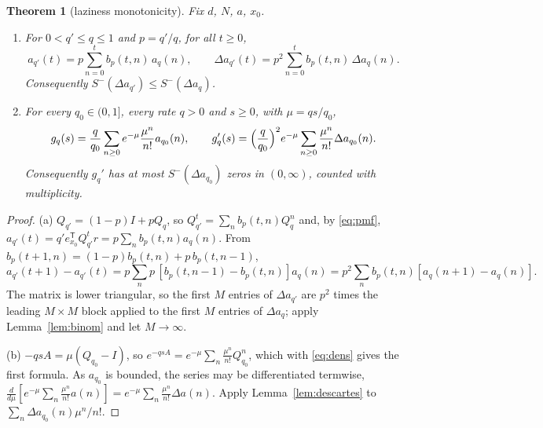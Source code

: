 \documentclass[11pt,a4paper]{article}
\newtheorem{theorem}{Theorem}[section]
\theoremstyle{definition}
\newcommand{\Sm}{S^{-}}
\newcommand{\T}{^{\mathsf T}}
\begin{document}
\begin{theorem}[laziness monotonicity]\label{thm:thinning}
Fix $d$, $N$, $a$, $x_0$.
\begin{enumerate}
\item[(a)] For $0<q'\le q\le1$ and $p=q'/q$, for all $t\ge0$,
\begin{equation}\label{eq:thin}
a_{q'}(t)=p\sum_{n=0}^tb_p(t,n)\,a_q(n),\qquad \Delta a_{q'}(t)=p^2\sum_{n=0}^tb_p(t,n)\,\Delta a_q(n).
\end{equation}
Consequently $\Sm(\Delta a_{q'})\le\Sm(\Delta a_q)$.
\item[(b)] For every $q_0\in(0,1]$, every rate $q>0$ and $s\ge0$, with $\mu=qs/q_0$,
\begin{equation}\label{eq:unif}
g_q(s)=\frac q{q_0}\sum_{n\ge0}e^{-\mu}\frac{\mu^n}{n!}a_{q_0}(n),\qquad
g_q'(s)=\Bigl(\frac q{q_0}\Bigr)^2e^{-\mu}\sum_{n\ge0}\frac{\mu^n}{n!}\Delta a_{q_0}(n).
\end{equation}
Consequently $g_q'$ has at most $\Sm(\Delta a_{q_0})$ zeros in $(0,\infty)$, counted with multiplicity.
\end{enumerate}
\end{theorem}
\begin{proof}
(a) $Q_{q'}=(1-p)I+pQ_q$, so $Q_{q'}^t=\sum_nb_p(t,n)Q_q^n$ and, by \eqref{eq:pmf}, $a_{q'}(t)=q'e_{x_0}\T Q_{q'}^tr=p\sum_nb_p(t,n)a_q(n)$. From $b_p(t+1,n)=(1-p)b_p(t,n)+p\,b_p(t,n-1)$,
\[
a_{q'}(t+1)-a_{q'}(t)=p\sum_np\,[b_p(t,n-1)-b_p(t,n)]a_q(n)=p^2\sum_nb_p(t,n)[a_q(n+1)-a_q(n)].
\]
The matrix is lower triangular, so the first $M$ entries of $\Delta a_{q'}$ are $p^2$ times the leading $M\times M$ block applied to the first $M$ entries of $\Delta a_q$; apply Lemma~\ref{lem:binom} and let $M\to\infty$.

(b) $-qsA=\mu(Q_{q_0}-I)$, so $e^{-qsA}=e^{-\mu}\sum_n\frac{\mu^n}{n!}Q_{q_0}^n$, which with \eqref{eq:dens} gives the first formula. As $a_{q_0}$ is bounded, the series may be differentiated termwise, $\frac{d}{d\mu}[e^{-\mu}\sum_n\frac{\mu^n}{n!}a(n)]=e^{-\mu}\sum_n\frac{\mu^n}{n!}\Delta a(n)$. Apply Lemma~\ref{lem:descartes} to $\sum_n\Delta a_{q_0}(n)\mu^n/n!$.
\end{proof}
\end{document}
